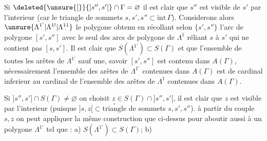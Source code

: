 Si $\deleted{\unsure{[}}{]s'',s'[}\cap\Gamma=\varnothing$ il est clair que $s''$ est visible de $s'$ par l'interieur (car le triangle de sommets $s,s',s''\subset\mathrm{int}\,\Gamma$). Considerons alors $\unsure{\Lambda^{1'}_{\mkern5mu\cdot}|\Lambda^{1!}|\Lambda^{11}_{\mkern5mu\cdot}}$ le polygone \margin{!}obtenu en récollant selon  $\{s',s''\}$ l'arc de polygone $[s',s'']$ avec le seul des arcs de polygone de $\Lambda^1$ réliant $s$ à $s'$ qui ne contient pas $[s,s']$. Il est clair que $S(\Lambda^{1'})\subset S(\Gamma)$ et que l'ensemble de toutes les arêtes de $\Lambda^{1'}$ sauf une, savoir $[s',s'']$ est contenu dans $A(\Gamma)$,  nécessairement l'ensemble des arètes de $\Lambda^{1'}$ contenues dans $A(\Gamma)$ est de cardinal inferieur  %
au cardinal de l'ensemble des arêtes de $\Lambda^1$ contenues dans $A(\Gamma)$.

Si $ {]s'',s'[}\cap S(\Gamma)\ne\varnothing$ on choisit $z\in S(\Gamma)\cap{]s'',s'[}$, il est clair que $z$ est visible  par l'interieur (puisque $ {]s,z[}\subset\overset{\circ}{\text{triangle}}$ de sommets $s,s',s''$). à partir du couple $s,z$ on peut appliquer la même construction que ci-dessus pour aboutir aussi à un polygone $\Lambda^{1'}$ tel que : a) $S(\Lambda^{1'})\subset S(\Gamma)$; b)
